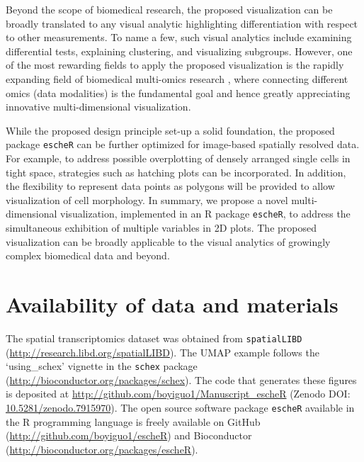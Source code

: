 \documentclass[unnumsec,webpdf,modern,large,namedate]{oup-authoring-template}%
\theoremstyle{thmstyleone}%
\theoremstyle{thmstyletwo}%
\theoremstyle{thmstylethree}%
\begin{document}
Beyond the scope of biomedical research, the proposed visualization can be broadly translated to any visual analytic highlighting differentiation with respect to other measurements. To name a few, such visual analytics include examining differential tests,  explaining clustering, and visualizing subgroups. However, one of the most rewarding fields to apply the proposed visualization is the rapidly expanding field of biomedical multi-omics research \citep{hasin_2017}, where connecting different omics (data modalities) is the fundamental goal and hence greatly appreciating innovative multi-dimensional visualization. 

While the proposed design principle set-up a solid foundation, the proposed package \texttt{escheR} can be further optimized for image-based spatially resolved data. For example, to address possible overplotting of densely arranged single cells in tight space, strategies such as hatching plots \citep{patrick2023spatial} can be incorporated. In addition, the flexibility to represent data points as polygons will be provided to allow visualization of cell morphology.
In summary, we propose a novel multi-dimensional visualization, implemented in an R package \texttt{escheR}, to address the simultaneous exhibition of multiple variables in 2D plots. The proposed visualization can be broadly applicable to the visual analytics of growingly complex biomedical data and beyond.

\section{Availability of data and materials}
The spatial transcriptomics dataset was obtained from \texttt{spatialLIBD} (\href{http://research.libd.org/spatialLIBD}{http://research.libd.org/spatialLIBD}). The UMAP example follows the `using\_schex' vignette in the \texttt{schex} package (\href{https://www.bioconductor.org/packages/schex}{http://bioconductor.org/packages/schex}). The code that generates these figures is deposited at \href{https://github.com/boyiguo1/Manuscript_escheR}{http://github.com/boyiguo1/Manuscript\_escheR} (Zenodo DOI: \href{https://zenodo.org/record/7915970}{10.5281/zenodo.7915970}). The open source software package \texttt{escheR} available in the R programming language is freely available on GitHub (\href{https://github.com/boyiguo1/escheR}{http://github.com/boyiguo1/escheR}) and Bioconductor (\href{https://bioconductor.org/packages/escheR}{http://bioconductor.org/packages/escheR}).
\end{document}
